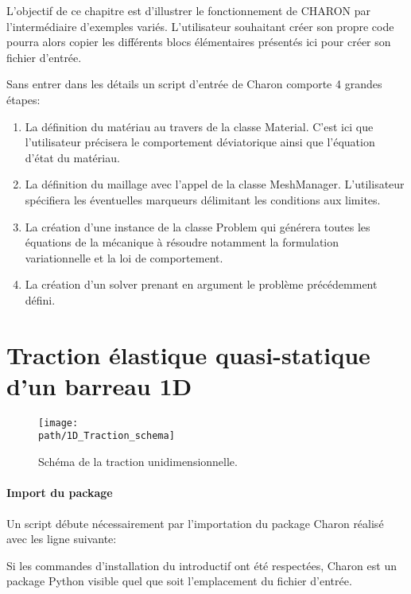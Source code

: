 \documentclass[10pt]{book}
\def\path{./fig}
\begin{document}
L'objectif de ce chapitre est d'illustrer le fonctionnement de CHARON par l'intermédiaire d'exemples variés. L'utilisateur souhaitant créer son propre code pourra alors copier les différents blocs élémentaires présentés ici pour créer son fichier d'entrée.

Sans entrer dans les détails un script d'entrée de Charon comporte 4 grandes étapes:
\begin{enumerate}
\item La définition du matériau au travers de la classe Material. C'est ici que l'utilisateur précisera le comportement déviatorique ainsi que l'équation d'état du matériau.
\item La définition du maillage avec l'appel de la classe MeshManager. L'utilisateur spécifiera les éventuelles marqueurs délimitant les conditions aux limites.
\item La création d'une instance de la classe Problem qui générera toutes les équations de la mécanique à résoudre notamment la formulation variationnelle et la loi de comportement.
\item La création d'un solver prenant en argument le problème précédemment défini.
\end{enumerate}
\clearpage
\section{Traction élastique quasi-statique d'un barreau 1D}\label{Section:Traction élastique quasi-statique d'un barreau 1D}

\begin{figure}[h!]
\centering \texttt{[image: \\path/1D\_Traction\_schema]}
\caption{Schéma de la traction unidimensionnelle.}
\label{fig:traction_1D_schema}
\end{figure}

\paragraph{Import du package} Un script débute nécessairement par l'importation du package Charon réalisé avec les ligne suivante:

\begin{figure}[h!]

\end{figure}

Si les commandes d'installation du  introductif ont été respectées, Charon est un package Python visible quel que soit l'emplacement du fichier d'entrée.
\end{document}
